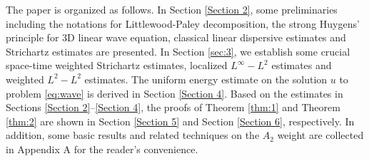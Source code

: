 \documentclass[11pt,twoside]{article}
\theoremstyle{plain}
\theoremstyle{definition}
\numberwithin{equation}{section}
\begin{document}
The paper is organized as follows. In Section \ref{Section 2}, some preliminaries including the notations for Littlewood-Paley decomposition, the strong Huygens' principle for 3D linear wave equation, classical linear dispersive estimates and Strichartz estimates are presented.
In Section \ref{sec:3}, we establish some crucial space-time weighted Strichartz estimates, localized $L^\infty-L^2$ estimates and weighted $L^2-L^2$ estimates.  The uniform energy estimate on the solution $u$ to problem \eqref{eq:wave} is derived in Section \ref{Section 4}.
Based on the estimates in Sections \ref{Section 2}--\ref{Section 4}, the proofs of Theorem \ref{thm:1} and Theorem \ref{thm:2}
are shown in Section \ref{Section 5} and Section \ref{Section 6}, respectively.
In addition, some basic results and related  techniques on the $A_2$ weight are collected in Appendix A for the reader's convenience.
\end{document}
